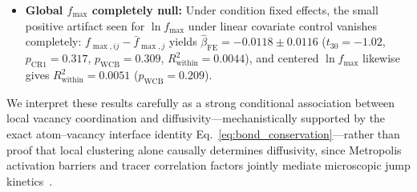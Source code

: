 \documentclass[aps,pre,reprint,superscriptaddress,amsmath,amssymb,floatfix]{revtex4-2}
\begin{document}
\begin{itemize}
  \item \textbf{Global $f_{\max}$ completely null:} Under condition fixed effects, the small positive artifact seen for $\ln f_{\max}$ under linear covariate control vanishes completely: $f_{\max,ij} - \bar{f}_{\max,j}$ yields $\hat{\beta}_{\mathrm{FE}} = -0.0118 \pm 0.0116$ ($t_{30} = -1.02$, $p_{\mathrm{CR1}} = 0.317$, $p_{\mathrm{WCB}} = 0.309$, $R^2_{\mathrm{within}} = 0.0044$), and centered $\ln f_{\max}$ likewise gives $R^2_{\mathrm{within}} = 0.0051$ ($p_{\mathrm{WCB}} = 0.209$).
\end{itemize}
We interpret these results carefully as a strong conditional association between local vacancy coordination and diffusivity---mechanistically supported by the exact atom--vacancy interface identity Eq.~\eqref{eq:bond_conservation}---rather than proof that local clustering alone causally determines diffusivity, since Metropolis activation barriers and tracer correlation factors jointly mediate microscopic jump kinetics~\cite{Kehr1984,Kehr1989}.
\end{document}
